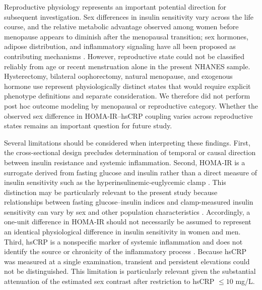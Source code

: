\documentclass[11pt]{article}
\begin{document}
Reproductive physiology represents an important potential direction for
subsequent investigation. Sex differences in insulin sensitivity vary
across the life course, and the relative metabolic advantage observed among
women before menopause appears to diminish after the menopausal transition;
sex hormones, adipose distribution, and inflammatory signaling have all
been proposed as contributing mechanisms
\citep{Gado2024SexIR,Henstridge2019MetabolicControlSex}. However,
reproductive state could not be classified reliably from age or recent
menstruation alone in the present NHANES sample. Hysterectomy, bilateral
oophorectomy, natural menopause, and exogenous hormone use represent
physiologically distinct states that would require explicit phenotype
definitions and separate consideration. We therefore did not perform post
hoc outcome modeling by menopausal or reproductive category. Whether the
observed sex difference in HOMA-IR--hsCRP coupling varies across reproductive
states remains an important question for future study.

Several limitations should be considered when interpreting these findings.
First, the cross-sectional design precludes determination of temporal or
causal direction between insulin resistance and systemic inflammation.
Second, HOMA-IR is a surrogate derived from fasting glucose and insulin
rather than a direct measure of insulin sensitivity such as the
hyperinsulinemic-euglycemic clamp
\citep{Matthews1985HOMA,Wallace2004HOMA}. This distinction may be
particularly relevant to the present study because relationships between
fasting glucose--insulin indices and clamp-measured insulin sensitivity can
vary by sex and other population characteristics
\citep{Pisprasert2013SurrogateIndices}. Accordingly, a one-unit difference
in HOMA-IR should not necessarily be assumed to represent an identical
physiological difference in insulin sensitivity in women and men. Third,
hsCRP is a nonspecific marker of systemic inflammation and does not identify
the source or chronicity of the inflammatory process
\citep{PepysHirschfield2003CRP}. Because hsCRP was measured at a single
examination, transient and persistent elevations could not be distinguished.
This limitation is particularly relevant given the substantial attenuation
of the estimated sex contrast after restriction to hsCRP $\leq10$ mg/L.
\end{document}
